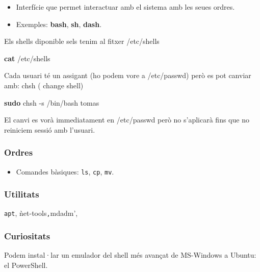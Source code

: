 \documentclass[
  a4paper,
]{article}
\newenvironment{Shaded}{\begin{snugshade}}{\end{snugshade}}
\newcommand{\AttributeTok}[1]{\textcolor[rgb]{0.13,0.29,0.53}{#1}}
\newcommand{\FunctionTok}[1]{\textcolor[rgb]{0.13,0.29,0.53}{\textbf{#1}}}
\newcommand{\NormalTok}[1]{#1}
\providecommand{\tightlist}{%
  \setlength{\itemsep}{0pt}\setlength{\parskip}{0pt}}
\begin{document}
\begin{itemize}
\tightlist
\item
  Interfície que permet interactuar amb el sistema amb les seues ordres.
\item
  Exemples: \textbf{bash}, \textbf{sh}, \textbf{dash}.
\end{itemize}

Els shells diponible sels tenim al fitxer /etc/shells

\begin{Shaded}
\begin{Highlighting}[]
\FunctionTok{cat}\NormalTok{ /etc/shells}
\end{Highlighting}
\end{Shaded}

Cada usuari té un assigant (ho podem vore a /etc/passwd) però es pot
canviar amb: chsh ( change shell)

\begin{Shaded}
\begin{Highlighting}[]
\FunctionTok{sudo}\NormalTok{ chsh }\AttributeTok{{-}s}\NormalTok{ /bin/bash tomas}
\end{Highlighting}
\end{Shaded}

El canvi es vorà immediatament en /etc/passwd però no s'aplicarà fins
que no reiniciem sessió amb l'usuari.

\subsubsection{Ordres}\label{ordres}

\begin{itemize}
\tightlist
\item
  Comandes bàsiques: \texttt{ls}, \texttt{cp}, \texttt{mv}.
\end{itemize}

\subsubsection{Utilitats}\label{utilitats}

\texttt{apt}, ǹet-tools\texttt{,}mdadm',

\subsubsection{Curiositats}\label{curiositats}

Podem instal·lar un emulador del shell més avançat de MS-Windows a
Ubuntu: el PowerShell.
\end{document}
